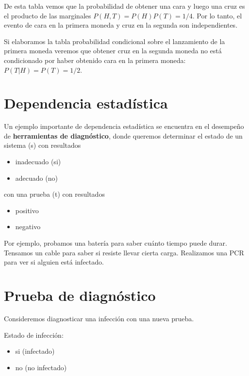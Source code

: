 \documentclass[
]{book}
\providecommand{\tightlist}{%
  \setlength{\itemsep}{0pt}\setlength{\parskip}{0pt}}
\begin{document}
De esta tabla vemos que la probabilidad de obtener una cara y luego una cruz es el producto de las marginales \(P(H, T)=P(H)P(T)=1/4\). Por lo tanto, el evento de cara en la primera moneda y cruz en la segunda son independientes.

Si elaboramos la tabla probabilidad condicional sobre el lanzamiento de la primera moneda veremos que obtener cruz en la segunda moneda no está condicionado por haber obtenido cara en la primera moneda: \(P(T|H)=P(T) =1/2\).

\hypertarget{dependencia-estaduxedstica}{%
\section{Dependencia estadística}\label{dependencia-estaduxedstica}}

Un ejemplo importante de dependencia estadística se encuentra en el desempeño de \textbf{herramientas de diagnóstico}, donde queremos determinar el estado de un sistema (s) con resultados

\begin{itemize}
\tightlist
\item
  inadecuado (si)
\item
  adecuado (no)
\end{itemize}

con una prueba (t) con resultados

\begin{itemize}
\tightlist
\item
  positivo
\item
  negativo
\end{itemize}

Por ejemplo, probamos una batería para saber cuánto tiempo puede durar. Tensamos un cable para saber si resiste llevar cierta carga. Realizamos una PCR para ver si alguien está infectado.

\hypertarget{prueba-de-diagnuxf3stico}{%
\section{Prueba de diagnóstico}\label{prueba-de-diagnuxf3stico}}

Consideremos diagnosticar una infección con una nueva prueba.

Estado de infección:

\begin{itemize}
\tightlist
\item
  si (infectado)
\item
  no (no infectado)
\end{itemize}
\end{document}
